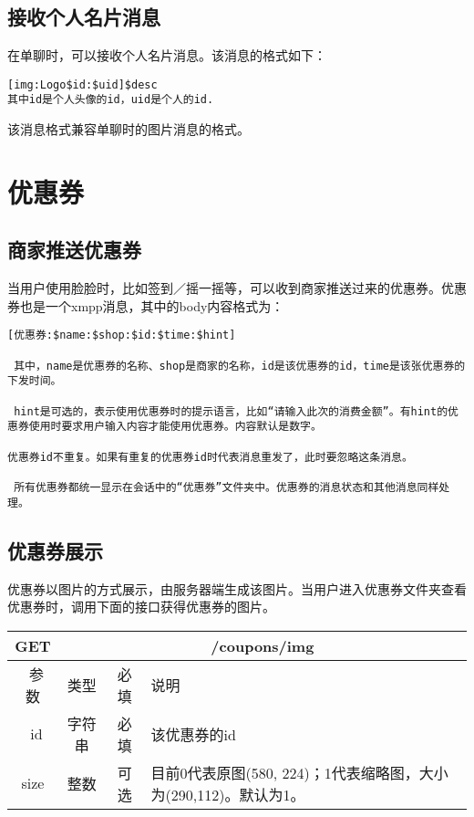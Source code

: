 \subsection{接收个人名片消息}
在单聊时，可以接收个人名片消息。该消息的格式如下：
\begin{verbatim}
[img:Logo$id:$uid]$desc
其中id是个人头像的id，uid是个人的id.
\end{verbatim}
该消息格式兼容单聊时的图片消息的格式。


\section{优惠券}

\subsection{商家推送优惠券}
当用户使用脸脸时，比如签到／摇一摇等，可以收到商家推送过来的优惠券。优惠券也是一个xmpp消息，其中的body内容格式为：

\begin{verbatim}
[优惠券:$name:$shop:$id:$time:$hint]

 其中，name是优惠券的名称、shop是商家的名称，id是该优惠券的id，time是该张优惠券的下发时间。
 
 hint是可选的，表示使用优惠券时的提示语言，比如“请输入此次的消费金额”。有hint的优惠券使用时要求用户输入内容才能使用优惠券。内容默认是数字。
 
优惠券id不重复。如果有重复的优惠券id时代表消息重发了，此时要忽略这条消息。
 
 所有优惠券都统一显示在会话中的“优惠券”文件夹中。优惠券的消息状态和其他消息同样处理。
\end{verbatim}

\subsection{优惠券展示}
优惠券以图片的方式展示，由服务器端生成该图片。当用户进入优惠券文件夹查看优惠券时，调用下面的接口获得优惠券的图片。

\begin{table}[H]
   \begin{center}
\begin{tabular}{|c|c|c|p{12cm}|}
\hline
GET & \multicolumn{3}{|c|}{/coupons/img} \\
\hline\hline
 \  参数  & 类型 & 必填 &  说明  \\
\hline
 \  id  & 字符串 & 必填 &  该优惠券的id  \\
\hline
 size  & 整数 & 可选 &  目前0代表原图(580, 224)；1代表缩略图，大小为(290,112)。默认为1。\\ 
\hline
\end{tabular}
   \end{center}
\end{table}



